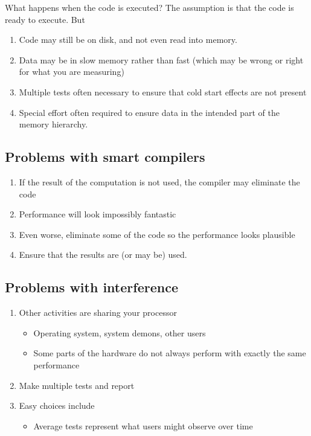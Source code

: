 \documentclass[%
oneside,                 %
final,                   %
10pt]{article}
\begin{document}
What happens when the code is executed? The assumption is that the code is ready to
execute. But
\begin{enumerate}
\item Code may still be on disk, and not even read into memory.

\item Data may be in slow memory rather than fast (which may be wrong or right for what you are measuring)

\item Multiple tests often necessary to ensure that cold start effects are not present

\item Special effort often required to ensure data in the intended part of the memory hierarchy.
\end{enumerate}

\noindent
\subsection*{Problems with smart compilers}

\begin{enumerate}
\item If the result of the computation is not used, the compiler may eliminate the code

\item Performance will look impossibly fantastic

\item Even worse, eliminate some of the code so the performance looks plausible

\item Ensure that the results are (or may be) used.
\end{enumerate}

\noindent
\subsection*{Problems with interference}
\begin{enumerate}
\item Other activities are sharing your processor
\begin{itemize}

  \item Operating system, system demons, other users

  \item Some parts of the hardware do not always perform with exactly the same performance

\end{itemize}

\noindent
\item Make multiple tests and report

\item Easy choices include
\begin{itemize}

  \item Average tests represent what users might observe over time
\end{itemize}

\noindent
\end{enumerate}
\end{document}
